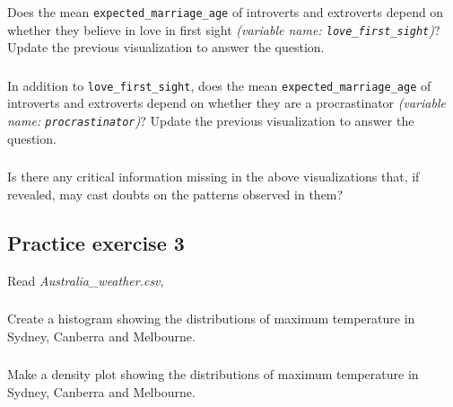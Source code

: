 \documentclass[
  letterpaper,
  DIV=11,
  numbers=noendperiod]{scrreprt}
\begin{document}
Does the mean \texttt{expected\_marriage\_age} of introverts and
extroverts depend on whether they believe in love in first sight
\emph{(variable name: \texttt{love\_first\_sight})}? Update the previous
visualization to answer the question.

\hypertarget{section-43}{%
\subsubsection{}\label{section-43}}

In addition to \texttt{love\_first\_sight}, does the mean
\texttt{expected\_marriage\_age} of introverts and extroverts depend on
whether they are a procrastinator \emph{(variable name:
\texttt{procrastinator})}? Update the previous visualization to answer
the question.

\hypertarget{section-44}{%
\subsubsection{}\label{section-44}}

Is there any critical information missing in the above visualizations
that, if revealed, may cast doubts on the patterns observed in them?

\hypertarget{practice-exercise-3-3}{%
\subsection{Practice exercise 3}\label{practice-exercise-3-3}}

Read \emph{Australia\_weather.csv},

\hypertarget{section-45}{%
\subsubsection{}\label{section-45}}

Create a histogram showing the distributions of maximum temperature in
Sydney, Canberra and Melbourne.

\hypertarget{section-46}{%
\subsubsection{}\label{section-46}}

Make a density plot showing the distributions of maximum temperature in
Sydney, Canberra and Melbourne.

\hypertarget{section-47}{%
\subsubsection{}\label{section-47}}
\end{document}

